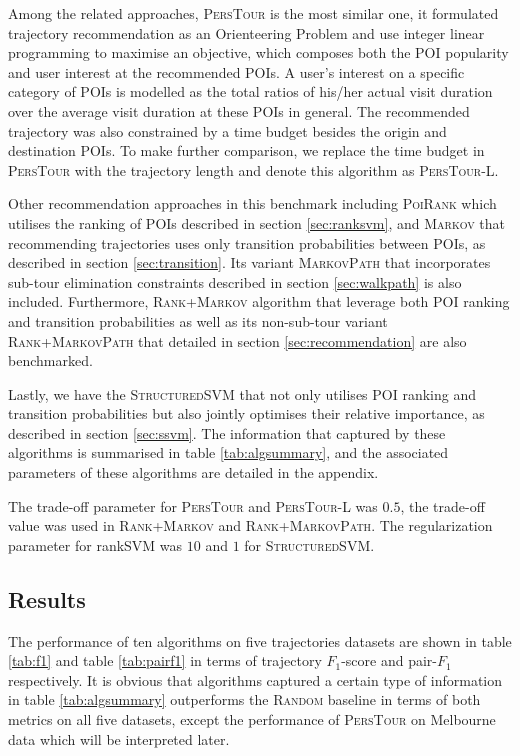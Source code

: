 Among the related approaches, \textsc{PersTour}\cite{ijcai15} is the most similar one, it formulated
trajectory recommendation as an Orienteering Problem and use integer linear programming to maximise
an objective, which composes both the POI popularity and user interest at the recommended POIs.
A user's interest on a specific category of POIs is modelled as the total ratios of his/her actual visit duration
over the average visit duration at these POIs in general.
The recommended trajectory was also constrained by a time budget besides the origin and destination POIs.
To make further comparison, we replace the time budget in \textsc{PersTour} with the trajectory length and
denote this algorithm as \textsc{PersTour-L}.

Other recommendation approaches in this benchmark including \textsc{PoiRank} which utilises the ranking of POIs
described in section \ref{sec:ranksvm}, and \textsc{Markov} that recommending trajectories uses only transition
probabilities between POIs, as described in section \ref{sec:transition}. Its variant \textsc{MarkovPath} that incorporates
sub-tour elimination constraints described in section \ref{sec:walkpath} is also included.
Furthermore, \textsc{Rank+Markov} algorithm that leverage both POI ranking and transition probabilities as well as
its non-sub-tour variant \textsc{Rank+MarkovPath} that detailed in section \ref{sec:recommendation} are also
benchmarked.

Lastly, we have the \textsc{StructuredSVM} that not only utilises POI ranking and transition probabilities but also
jointly optimises their relative importance, as described in section \ref{sec:ssvm}.
The information that captured by these algorithms is summarised in table \ref{tab:algsummary},
and the associated parameters of these algorithms are detailed in the appendix.

The trade-off parameter for \textsc{PersTour} and \textsc{PersTour-L} was $0.5$,
the trade-off value was used in \textsc{Rank+Markov} and \textsc{Rank+MarkovPath}.
The regularization parameter for rankSVM was $10$
and $1$ for \textsc{StructuredSVM}.


\subsection{Results}
\label{sec:result}




The performance of ten algorithms on five trajectories datasets are shown in table \ref{tab:f1}
and table \ref{tab:pairf1} in terms of trajectory $F_1$-score and pair-$F_1$ respectively.
%
It is obvious that algorithms captured a certain type of information in table \ref{tab:algsummary}
outperforms the \textsc{Random} baseline in terms of both metrics on all five datasets,
except the performance of \textsc{PersTour}\cite{ijcai15} on Melbourne data which will be interpreted later.

